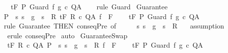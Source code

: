 \begin{isabellebody}
\ \ {\isasymLongrightarrow}\ {\isasymGamma}{\isacharcomma}{\isasymTheta}{\isasymturnstile}\isactrlsub t\isactrlbsub {\isacharslash}F\isactrlesub \ P\ Guard\ f\ g\ c\ Q{\isacharcomma}A{\isachardoublequoteclose}\isanewline
%
\isadelimproof
\ \ %
\endisadelimproof
%
\isatagproof
{}\isamarkupfalse%
\ {\isacharparenleft}rule\ Guard{\isacharparenright}%
\endisatagproof
{\isafoldproof}%
%
\isadelimproof
\isanewline
%
\endisadelimproof
\isanewline
{}\isamarkupfalse%
\ Guarantee{\isacharcolon}\isanewline
\ {\isachardoublequoteopen}{\isasymlbrakk}P\ {\isasymsubseteq}\ {\isacharbraceleft}s{\isachardot}\ s\ {\isasymin}\ g\ {\isasymlongrightarrow}\ s\ {\isasymin}\ R{\isacharbraceright}{\isacharsemicolon}\ {\isasymGamma}{\isacharcomma}{\isasymTheta}{\isasymturnstile}\isactrlsub t\isactrlbsub {\isacharslash}F\isactrlesub \ R\ c\ Q{\isacharcomma}A{\isacharsemicolon}\ f\ {\isasymin}\ F{\isasymrbrakk}\ \isanewline
\ \ {\isasymLongrightarrow}\ {\isasymGamma}{\isacharcomma}{\isasymTheta}{\isasymturnstile}\isactrlsub t\isactrlbsub {\isacharslash}F\isactrlesub \ P\ {\isacharparenleft}Guard\ f\ g\ c{\isacharparenright}\ Q{\isacharcomma}A{\isachardoublequoteclose}\isanewline
%
\isadelimproof
%
\endisadelimproof
%
\isatagproof
{}\isamarkupfalse%
\ {\isacharparenleft}rule\ Guarantee\ {\isacharbrackleft}THEN\ conseqPre{\isacharcomma}\ of\ {\isacharunderscore}\ {\isacharunderscore}\ {\isacharunderscore}\ {\isacharunderscore}\ {\isacharunderscore}\ {\isachardoublequoteopen}{\isacharbraceleft}s{\isachardot}\ s\ {\isasymin}\ g\ {\isasymlongrightarrow}\ s\ {\isasymin}\ R{\isacharbraceright}{\isachardoublequoteclose}{\isacharbrackright}{\isacharparenright}\isanewline
{}\isamarkupfalse%
\ \ \ assumption\isanewline
{}\isamarkupfalse%
\ \ {\isacharparenleft}erule\ conseqPre{\isacharparenright}\isanewline
{}\isamarkupfalse%
\ auto\isanewline
{}\isamarkupfalse%
%
\endisatagproof
{\isafoldproof}%
%
\isadelimproof
\isanewline
%
\endisadelimproof
\isanewline
{}\isamarkupfalse%
\ GuaranteeSwap{\isacharcolon}\isanewline
\ {\isachardoublequoteopen}{\isasymlbrakk}\ {\isasymGamma}{\isacharcomma}{\isasymTheta}{\isasymturnstile}\isactrlsub t\isactrlbsub {\isacharslash}F\isactrlesub \ R\ c\ Q{\isacharcomma}A{\isacharsemicolon}\ P\ {\isasymsubseteq}\ {\isacharbraceleft}s{\isachardot}\ s\ {\isasymin}\ g\ {\isasymlongrightarrow}\ s\ {\isasymin}\ R{\isacharbraceright}{\isacharsemicolon}\ f\ {\isasymin}\ F{\isasymrbrakk}\ \isanewline
\ \ {\isasymLongrightarrow}\ {\isasymGamma}{\isacharcomma}{\isasymTheta}{\isasymturnstile}\isactrlsub t\isactrlbsub {\isacharslash}F\isactrlesub \ P\ {\isacharparenleft}Guard\ f\ g\ c{\isacharparenright}\ Q{\isacharcomma}A{\isachardoublequoteclose}\isanewline

\end{isabellebody}
